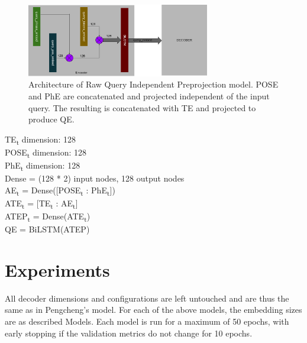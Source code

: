 \documentclass{IEEEtran}
\begin{document}
        \begin{figure}[h]
          \centering
          \includegraphics[width=8cm]{advlp.png}
          \caption{Architecture of Raw Query Independent Preprojection model. POSE and PhE are
          concatenated and projected independent of the input query. The resulting is 
          concatenated with TE and projected to produce QE.}
          \label{fig:advlp}
        \end{figure}

        \hspace*{-3.5mm}TE\textsubscript{t} dimension: 128 \\
        POSE\textsubscript{t} dimension: 128 \\
        PhE\textsubscript{t} dimension: 128 \\
        Dense = (128 * 2) input nodes, 128 output nodes \\ 

        \hspace*{-3.5mm}AE\textsubscript{t} = Dense([POSE\textsubscript{t} : 
        PhE\textsubscript{t}]) \\
        ATE\textsubscript{t} = [TE\textsubscript{t} : AE\textsubscript{t}] \\
        ATEP\textsubscript{t} = Dense(ATE\textsubscript{t}) \\
        QE = BiLSTM(ATEP) \\


    \section{Experiments}
    All decoder dimensions and configurations are left untouched and are thus the same as in
    Pengcheng's model. For each of the above models, the embedding sizes are as described Models.
    Each model is run for a maximum of 50 epochs, with early stopping if the validation
    metrics do not change for 10 epochs.
\end{document}

